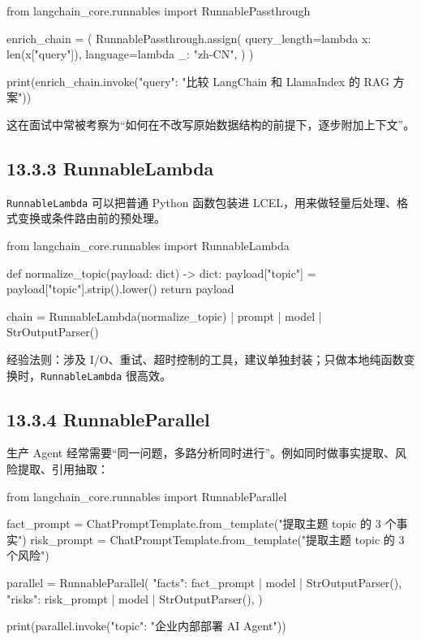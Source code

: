 \begin{codeblock}
from langchain_core.runnables import RunnablePassthrough

enrich_chain = (
    RunnablePassthrough.assign(
        query_length=lambda x: len(x["query"]),
        language=lambda _: "zh-CN",
    )
)

print(enrich_chain.invoke({"query": "比较 LangChain 和 LlamaIndex 的 RAG 方案"}))
\end{codeblock}

这在面试中常被考察为``如何在不改写原始数据结构的前提下，逐步附加上下文''。


\subsection{13.3.3 RunnableLambda}

\texttt{RunnableLambda} 可以把普通 Python 函数包装进 LCEL，用来做轻量后处理、格式变换或条件路由前的预处理。


\begin{codeblock}
from langchain_core.runnables import RunnableLambda

def normalize_topic(payload: dict) -> dict:
    payload["topic"] = payload["topic"].strip().lower()
    return payload

chain = RunnableLambda(normalize_topic) | prompt | model | StrOutputParser()
\end{codeblock}

经验法则：涉及 I/O、重试、超时控制的工具，建议单独封装；只做本地纯函数变换时，\texttt{RunnableLambda} 很高效。


\subsection{13.3.4 RunnableParallel}

生产 Agent 经常需要``同一问题，多路分析同时进行''。例如同时做事实提取、风险提取、引用抽取：


\begin{codeblock}
from langchain_core.runnables import RunnableParallel

fact_prompt = ChatPromptTemplate.from_template("提取主题 {topic} 的 3 个事实")
risk_prompt = ChatPromptTemplate.from_template("提取主题 {topic} 的 3 个风险")

parallel = RunnableParallel({
    "facts": fact_prompt | model | StrOutputParser(),
    "risks": risk_prompt | model | StrOutputParser(),
})

print(parallel.invoke({"topic": "企业内部部署 AI Agent"}))
\end{codeblock}

